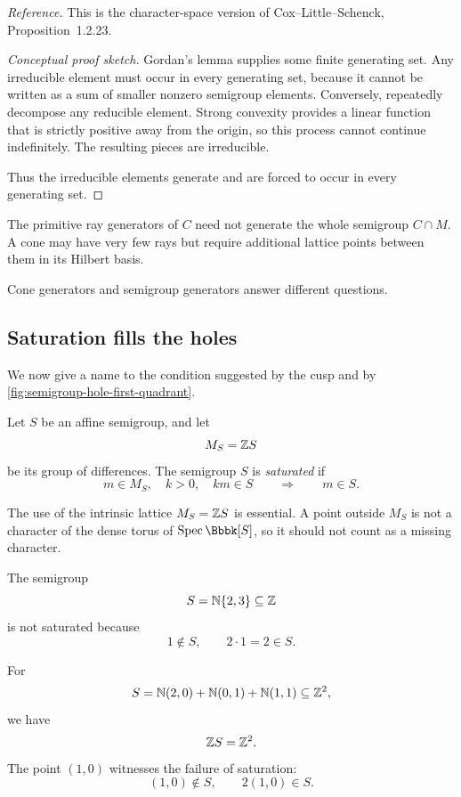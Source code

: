 \noindent
\textit{Reference.}
This is the character-space version of Cox--Little--Schenck,
Proposition~1.2.23.

\begin{proof}[Conceptual proof sketch]
Gordan's lemma supplies some finite generating set. Any irreducible
element must occur in every generating set, because it cannot be
written as a sum of smaller nonzero semigroup elements. Conversely,
repeatedly decompose any reducible element. Strong convexity provides
a linear function that is strictly positive away from the origin, so
this process cannot continue indefinitely. The resulting pieces are
irreducible.

Thus the irreducible elements generate and are forced to occur in
every generating set.
\end{proof}

\begin{warningbox}
The primitive ray generators of \(C\) need not generate the whole
semigroup \(C\cap M\). A cone may have very few rays but require
additional lattice points between them in its Hilbert basis.

Cone generators and semigroup generators answer different questions.
\end{warningbox}

\subsection{Saturation fills the holes}

We now give a name to the condition suggested by the cusp and by
\cref{fig:semigroup-hole-first-quadrant}.

\begin{definition}
Let \(S\) be an affine semigroup, and let
\[
M_S=\mathbb{Z} S
\]
be its group of differences. The semigroup \(S\) is
\emph{saturated} if
\[
m\in M_S,\quad k>0,\quad km\in S
\qquad\Longrightarrow\qquad
m\in S.
\]
\end{definition}

The use of the intrinsic lattice \(M_S=\mathbb{Z} S\) is essential. A point
outside \(M_S\) is not a character of the dense torus of
\(\Spec\Bbbk[S]\), so it should not count as a missing character.

\begin{example}
The semigroup
\[
S=\mathbb{N}\{2,3\}\subseteq\mathbb{Z}
\]
is not saturated because
\[
1\notin S,
\qquad
2\cdot1=2\in S.
\]
\end{example}

\begin{example}
For
\[
S=\mathbb{N}(2,0)+\mathbb{N}(0,1)+\mathbb{N}(1,1)\subseteq\mathbb{Z}^2,
\]
we have
\[
\mathbb{Z} S=\mathbb{Z}^2.
\]
The point \((1,0)\) witnesses the failure of saturation:
\[
(1,0)\notin S,
\qquad
2(1,0)\in S.
\]
\end{example}


